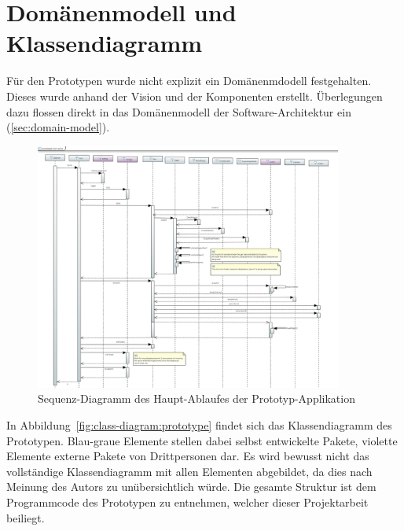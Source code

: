 
\section{Domänenmodell und Klassendiagramm}
\label{sec:prototype:domain-model-class-diagram}

Für den Prototypen wurde nicht explizit ein Domänenmdodell festgehalten. Dieses
wurde anhand der Vision und der Komponenten erstellt. Überlegungen dazu flossen
direkt in das Domänenmodell der Software-Architektur ein
(\ref{sec:domain-model}).

\begin{figure}[H]
    \centering
    \includegraphics[width=0.9\textwidth]{img/prototype_sequence_diagram.png}
    \caption{Sequenz-Diagramm des Haupt-Ablaufes der
        Prototyp-Applikation\protect\footnotemark}\label{fig:sequence-diagram:prototype}
\end{figure}

In Abbildung~\ref{fig:class-diagram:prototype} findet sich das Klassendiagramm
des Prototypen. Blau-graue Elemente stellen dabei selbst entwickelte Pakete,
violette Elemente externe Pakete von Drittpersonen dar. Es wird bewusst
nicht das vollständige Klassendiagramm mit allen Elementen abgebildet, da dies
nach Meinung des Autors zu unübersichtlich würde. Die gesamte Struktur ist dem
Programmcode des Prototypen zu entnehmen, welcher dieser Projektarbeit
beiliegt.

